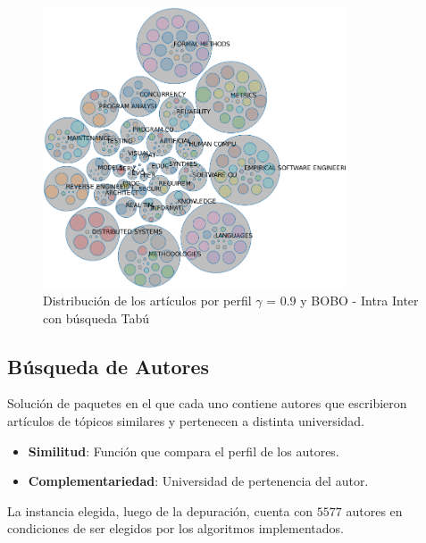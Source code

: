 \begin{figure}[H]
  \centering
    \includegraphics[width=0.8\textwidth]{resultados/papers/BOBO/INTRA_INTER/bubbles-gamma-with-local-09.png}
  \caption{Distribución de los artículos por perfil $\gamma$ = $0.9$ y BOBO - Intra Inter con búsqueda Tabú}
  \label{res:img-papers-bubbles-gamma09-hac-intra-inter-bobo}
\end{figure}
\newpage
\subsection{Búsqueda de Autores}
Solución de paquetes en el que cada uno contiene autores que escribieron artículos de tópicos similares y pertenecen a distinta universidad.

\begin{itemize}
  \item \textbf{Similitud}: Función que compara el perfil de los autores.
  \item \textbf{Complementariedad}: Universidad de pertenencia del autor.
\end{itemize}

La instancia elegida, luego de la depuración, cuenta con $5577$ autores en condiciones de ser elegidos por los algoritmos implementados.

